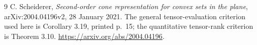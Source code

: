 \documentclass[10pt,a4paper,oneside,openany]{book}
\theoremstyle{definition}
\theoremstyle{remark}
\begin{document}
\begingroup
\let\chapter\section
\begin{thebibliography}{9}
C. Scheiderer, \emph{Second-order cone representation for convex sets
in the plane}, arXiv:2004.04196v2, 28 January 2021.
The general tensor-evaluation criterion used here is Corollary 3.19,
printed p.~15; the quantitative tensor-rank criterion is Theorem 3.10.
\url{https://arxiv.org/abs/2004.04196}.
\end{thebibliography}
\endgroup
\end{document}
